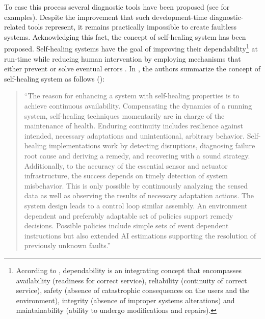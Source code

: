 To ease this process several diagnostic tools have been proposed (see
 for examples).
%
Despite the improvement that such development-time diagnostic-related
tools represent, it remains practically impossible to create faultless
systems.
%
Acknowledging this fact, the concept of self-healing system has been
proposed.
%
Self-healing systems have the goal of improving their
dependability\footnote{According to \citep{Avizienis04}, dependability
  is an integrating concept that encompasses availability (readiness
  for correct service), reliability (continuity of correct service),
  safety (absence of catastrophic consequences on the users and the
  environment), integrity (absence of improper systems alterations)
  and maintainability (ability to undergo modifications and repairs).}
at run-time while reducing human intervention by employing mechanisms
that either prevent or solve eventual errors \citep{Ghosh07}.
%
In \citep{Psaier11}, the authors summarize the concept of self-healing
system as follows ():
%
\vspace{-1em}
\begin{quote}
  ``The reason for enhancing a system with self-healing properties is
  to achieve continuous availability.
  Compensating the dynamics of a running system, self-healing
  techniques momentarily are in charge of the maintenance of health.
  Enduring continuity includes resilience against intended, necessary
  adaptations and unintentional, arbitrary behavior.
  Self-healing implementations work by detecting disruptions,
  diagnosing failure root cause and deriving a remedy, and recovering
  with a sound strategy.
  Additionally, to the accuracy of the essential sensor and actuator
  infrastructure, the success depends on timely detection of system
  misbehavior.
  This is only possible by continuously analyzing the sensed data as
  well as observing the results of necessary adaptation actions.
  The system design leads to a control loop similar assembly.
  An environment dependent and preferably adaptable set of policies
  support remedy decisions.
  Possible policies include simple sets of event dependent
  instructions but also extended AI estimations supporting the
  resolution of previously unknown faults.''
\end{quote}%
\vspace{-0.1em}
